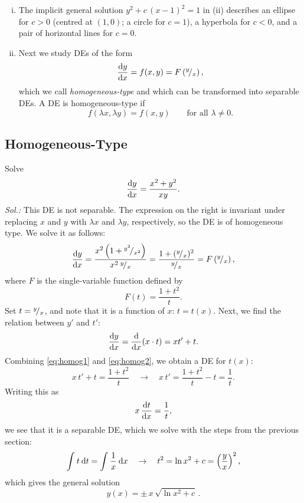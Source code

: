 \begin{remark}
\label{rem:sov}
\begin{enumerate}[(i)]
	\item The implicit general solution $y^2+c\,(x-1)^2=1$ in (ii) describes an ellipse for $c>0$ (centred at $(1,0)$; a circle for $c=1$), a hyperbola for $c<0$, and a pair of horizontal lines for $c=0$.
	\item Next we study DEs of the form
	\[ \displaystyle{\frac{\mathrm{d}y}{\mathrm{d}x}} = f(x,y) = F\left({}^{y}\!/_{x}\right),\]
	which we call \emph{homogeneous-type} and which can be transformed into separable DEs. A DE is homogeneous-type if 
	\[ f(\lambda x,\lambda y) = f(x,y) \qquad \text{for all~} \lambda\not=0. \]
\end{enumerate}
\end{remark}


\subsection{Homogeneous-Type}

\begin{example} Solve
	\[ \displaystyle{\frac{\mathrm{d}y}{\mathrm{d}x}}=\frac{x^2+y^2}{xy}. \]
{\it Sol.:} This DE is not separable. The expression on the right is invariant under replacing $x$ and $y$ with $\lambda x$ and $\lambda y$, respectively, so the DE is of homogeneous type. We solve it as follows:
\begin{equation}
\label{eq:homog1}
\displaystyle{\frac{\mathrm{d}y}{\mathrm{d}x}} = \frac{x^2\left( 1+{}^{y^2}\!/_{x^2} \right)}{x^2\:{}^{y}\!/_{x}}
= \frac{1+({}^{y}\!/_{x})^2}{{}^{y}\!/_{x}} = F\left({}^{y}\!/_{x}\right),
\end{equation}
where $F$ is the single-variable function defined by
\[ F(t) = \frac{1+t^2}{t}. \]
Set $t={}^{y}\!/_{x}$, and note that it is a function of $x$: $t=t(x)$. Next, we find the relation between $y'$ and $t'$:
\begin{equation}
\label{eq:homog2}
 \displaystyle{\frac{\mathrm{d}y}{\mathrm{d}x}} = \displaystyle{\frac{\mathrm{d}}{\mathrm{d}x}}(x \cdot t ) = xt'+t.
\end{equation}
Combining \eqref{eq:homog1} and \eqref{eq:homog2}, we obtain a DE for $t(x)$:
\[ x\,t'+t=\frac{1+t^2}{t} \quad \rightarrow \quad x\,t'=\frac{1+t^2}{t}-t=\frac{1}{t}. \]
Writing this as
\[ x\,\displaystyle{\frac{\mathrm{d}t}{\mathrm{d}x}} = \frac{1}{t}, \]
we see that it is a separable DE, which we solve with the steps from the previous section:
\[ \int_{}^{} t \: \mathrm{d} t = \int_{}^{} \frac{1}{x} \: \mathrm{d} x \quad \rightarrow \quad
t^2 = \ln x^2+c = \left( \frac{y}{x} \right)^2, \]
which gives the general solution
\[ y(x) = \pm \, x \, \sqrt{\ln x^2+c}\,. \]
\end{example}

